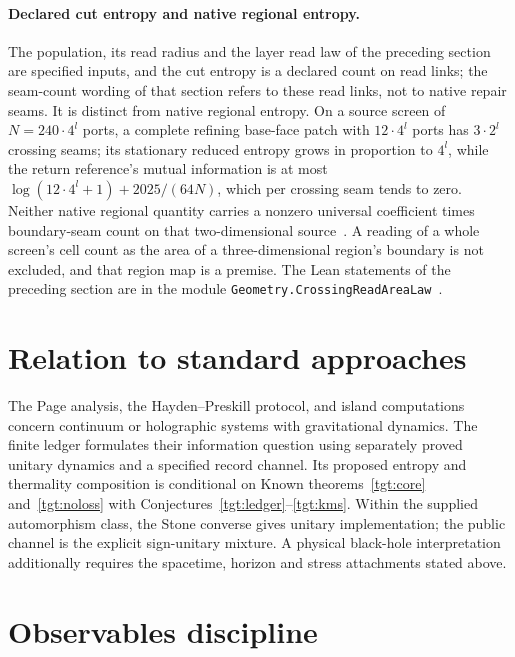 \documentclass[11pt]{article}
\theoremstyle{remark}
\begin{document}


\paragraph{Declared cut entropy and native regional entropy.}
The population, its read radius and the layer read law of the preceding
section are specified inputs, and the cut entropy is a declared count on
read links; the seam-count wording of that section refers to these read
links, not to native repair seams. It is distinct from native regional
entropy. On a source screen of \(N=240\cdot4^l\) ports, a complete refining
base-face patch with \(12\cdot4^l\) ports has \(3\cdot2^l\) crossing seams;
its stationary reduced entropy grows in proportion to \(4^l\), while the
return reference's mutual information is at most
\(\log(12\cdot4^l+1)+2025/(64N)\), which per crossing seam tends to zero.
Neither native regional quantity carries a nonzero universal coefficient
times boundary-seam count on that two-dimensional source~\cite{ophentropy}.
A reading of a whole screen's cell count as the area of a three-dimensional
region's boundary is not excluded, and that region map is a premise. The
Lean statements of the preceding section are in the module
\texttt{Geometry.CrossingReadAreaLaw}~\cite{ophlean}.

\section{Relation to standard approaches}

The Page analysis, the Hayden--Preskill protocol, and island computations
concern continuum or holographic systems with gravitational dynamics. The
finite ledger formulates their information question using separately proved
unitary dynamics and a specified record channel. Its proposed entropy and
thermality composition is conditional on
Known theorems~\ref{tgt:core} and~\ref{tgt:noloss} with Conjectures~\ref{tgt:ledger}--\ref{tgt:kms}. Within the supplied automorphism
class, the Stone converse gives unitary implementation; the public channel
is the explicit sign-unitary mixture. A physical black-hole interpretation
additionally requires the spacetime, horizon and stress attachments stated
above.

\section{Observables discipline}
\end{document}
